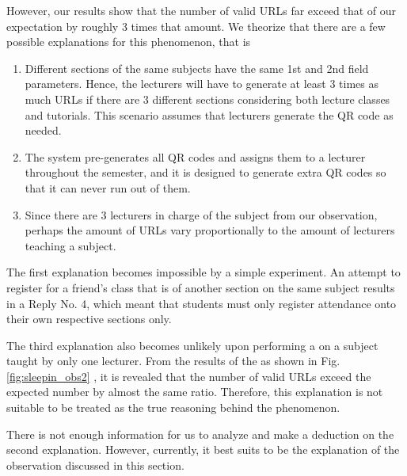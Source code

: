 \documentclass[runningheads]{llncs}
\begin{document}
However, our results show that the number of valid URLs far exceed that of our expectation by roughly 3 times that amount. We theorize that there are a few possible explanations for this phenomenon, that is

\begin{enumerate}
    \item Different sections of the same subjects have the same 1st and 2nd field parameters. Hence, the lecturers will have to generate at least 3 times as much URLs if there are 3 different sections considering both lecture classes and tutorials. This scenario assumes that lecturers generate the QR code as needed.
    \item The system pre-generates all QR codes and assigns them to a lecturer \\throughout the semester, and it is designed to generate extra QR codes so that it can never run out of them.
    \item Since there are 3 lecturers in charge of the subject from our observation, perhaps the amount of URLs vary proportionally to the amount of lecturers teaching a subject.
\end{enumerate}

The first explanation becomes impossible by a simple experiment. An attempt to register for a friend's class that is of another section on the same subject results in a Reply No. 4, which meant that students must only register attendance onto their own respective sections only.

The third explanation also becomes unlikely upon performing a \scanattack{} on a subject taught by only one lecturer. From the results of the \scanattack{} as shown in Fig. \ref{fig:sleepin_obs2}
, it is revealed that the number of valid URLs exceed the expected number by almost the same ratio. Therefore, this explanation is not suitable to be treated as the true reasoning behind the phenomenon.

There is not enough information for us to analyze and make a deduction on the second explanation. However, currently, it best suits to be the explanation of the observation discussed in this section. 
\end{document}
